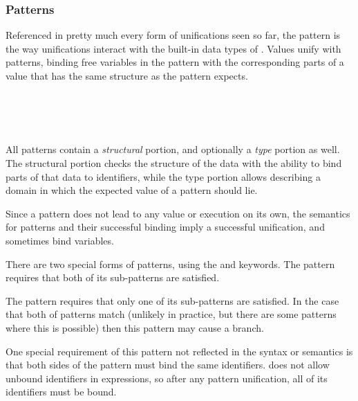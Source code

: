 \subsubsection{Patterns}

Referenced in pretty much every form of unifications seen so far, the pattern is
the way unifications interact with the built-in data types of \Trilogy{}. Values
unify with patterns, binding free variables in the pattern with the corresponding
parts of a value that has the same structure as the pattern expects.

\begin{bnf*}
     \\
     \\
     \\
\end{bnf*}

All patterns contain a \emph{structural} portion, and optionally a \emph{type}
portion as well. The structural portion checks the structure of the data with
the ability to bind parts of that data to identifiers, while the type portion
allows describing a domain in which the expected value of a pattern should lie.

Since a pattern does not lead to any value or execution on its own, the semantics for
patterns and their successful binding imply a successful unification, and sometimes
bind variables.

There are two special forms of patterns, using the  and  keywords.
The  pattern requires that both of its sub-patterns are satisfied.

\begin{prooftree}
\end{prooftree}

The  pattern requires that only one of its sub-patterns are satisfied.
In the case that both of patterns match (unlikely in practice, but there are
some patterns where this is possible) then this pattern may cause a branch.

One special requirement of this pattern not reflected in the syntax or
semantics is that both sides of the  pattern must bind the same
identifiers. \Trilogy{} does not allow unbound identifiers in expressions,
so after any pattern unification, all of its identifiers must be bound.

